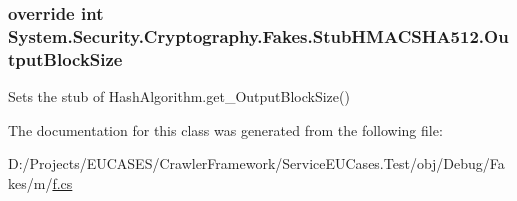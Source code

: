 \hypertarget{class_system_1_1_security_1_1_cryptography_1_1_fakes_1_1_stub_h_m_a_c_s_h_a512_a967efe24b8611ca6162d33355a7da4fe}{
\subsubsection[{Output\-Block\-Size}]{\setlength{\rightskip}{0pt plus 5cm}override int System.\-Security.\-Cryptography.\-Fakes.\-Stub\-H\-M\-A\-C\-S\-H\-A512.\-Output\-Block\-Size\hspace{0.3cm}{\ttfamily [get]}}}\label{class_system_1_1_security_1_1_cryptography_1_1_fakes_1_1_stub_h_m_a_c_s_h_a512_a967efe24b8611ca6162d33355a7da4fe}


Sets the stub of Hash\-Algorithm.\-get\-\_\-\-Output\-Block\-Size()



The documentation for this class was generated from the following file\-:\begin{DoxyCompactItemize}
\item 
D\-:/\-Projects/\-E\-U\-C\-A\-S\-E\-S/\-Crawler\-Framework/\-Service\-E\-U\-Cases.\-Test/obj/\-Debug/\-Fakes/m/\hyperlink{m_2f_8cs}{f.\-cs}\end{DoxyCompactItemize}
